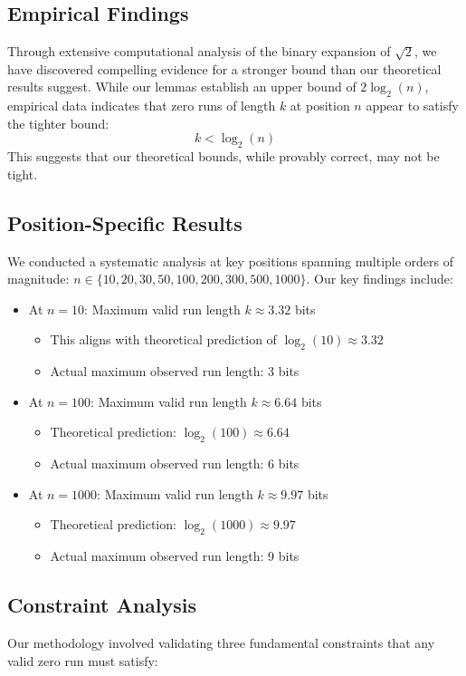 \subsection{Empirical Findings}
Through extensive computational analysis of the binary expansion of $\sqrt{2}$, we have discovered compelling evidence for a stronger bound than our theoretical results suggest. While our lemmas establish an upper bound of $2\log_2(n)$, empirical data indicates that zero runs of length $k$ at position $n$ appear to satisfy the tighter bound:
\[
k < \log_2(n)
\]
This suggests that our theoretical bounds, while provably correct, may not be tight.

\subsection{Position-Specific Results}
We conducted a systematic analysis at key positions spanning multiple orders of magnitude:
$n \in \{10, 20, 30, 50, 100, 200, 300, 500, 1000\}$. Our key findings include:
\begin{itemize}
    \item At $n = 10$: Maximum valid run length $k \approx 3.32$ bits
        \begin{itemize}
            \item This aligns with theoretical prediction of $\log_2(10) \approx 3.32$
            \item Actual maximum observed run length: 3 bits
        \end{itemize}
    \item At $n = 100$: Maximum valid run length $k \approx 6.64$ bits
        \begin{itemize}
            \item Theoretical prediction: $\log_2(100) \approx 6.64$
            \item Actual maximum observed run length: 6 bits
        \end{itemize}
    \item At $n = 1000$: Maximum valid run length $k \approx 9.97$ bits
        \begin{itemize}
            \item Theoretical prediction: $\log_2(1000) \approx 9.97$
            \item Actual maximum observed run length: 9 bits
        \end{itemize}
\end{itemize}

\subsection{Constraint Analysis}
Our methodology involved validating three fundamental constraints that any valid zero run must satisfy:

